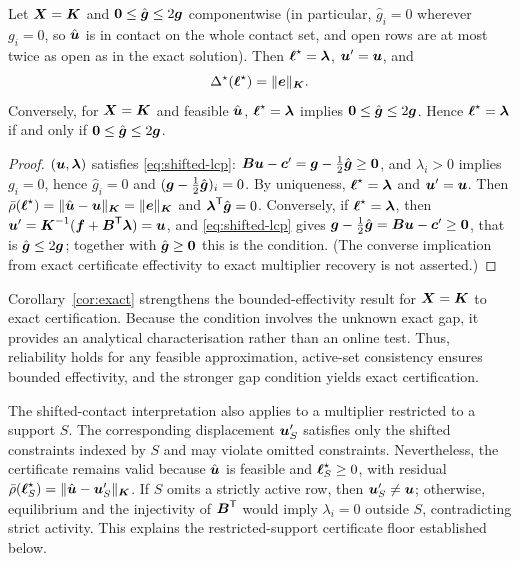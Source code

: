 \begin{corollary}\label{cor:exact}
Let $\boldsymbol{X}=\boldsymbol{K}$ and $\boldsymbol 0\le\hat{\boldsymbol{g}}\le2\boldsymbol{g}$ componentwise (in particular, $\hat g_i=0$ wherever $g_i=0$, so $\hat{\boldsymbol{u}}$ is in contact on the whole
contact set, and open rows are at most twice as open as in the exact solution). Then $\boldsymbol{\ell}^{\star}=\boldsymbol{\lambda}$, $\boldsymbol{u}'=\boldsymbol{u}$, and
\begin{equation}\label{eq:exact}
  \Delta^{\star}(\boldsymbol{\ell}^{\star})=\lVert \boldsymbol{e} \rVert_{\boldsymbol{K}}.
\end{equation}
Conversely, for $\boldsymbol{X}=\boldsymbol{K}$ and feasible $\hat{\boldsymbol{u}}$, $\boldsymbol{\ell}^{\star}=\boldsymbol{\lambda}$ implies $\boldsymbol 0\le\hat{\boldsymbol{g}}\le2\boldsymbol{g}$. Hence $\boldsymbol{\ell}^{\star}=\boldsymbol{\lambda}$ if and only if $\boldsymbol 0\le\hat{\boldsymbol{g}}\le2\boldsymbol{g}$.
\end{corollary}
\begin{proof}
$(\boldsymbol{u},\boldsymbol{\lambda})$ satisfies \eqref{eq:shifted-lcp}: $\boldsymbol{B}\boldsymbol{u}-\boldsymbol{c}'=\boldsymbol{g}-\tfrac12\hat{\boldsymbol{g}}\ge\boldsymbol 0$, and $\lambda_i>0$ implies $g_i=0$, hence $\hat g_i=0$ and
$(\boldsymbol{g}-\frac12\hat{\boldsymbol{g}})_i=0$. By uniqueness, $\boldsymbol{\ell}^{\star}=\boldsymbol{\lambda}$ and $\boldsymbol{u}'=\boldsymbol{u}$. Then $\bar{\rho}(\boldsymbol{\ell}^{\star})=\lVert \hat{\boldsymbol{u}}-\boldsymbol{u} \rVert_{\boldsymbol{K}}=\lVert \boldsymbol{e} \rVert_{\boldsymbol{K}}$ and $\boldsymbol{\lambda}^{\mathsf{T}}\hat{\boldsymbol{g}}=0$.
Conversely, if $\boldsymbol{\ell}^{\star}=\boldsymbol{\lambda}$, then $\boldsymbol{u}'=\boldsymbol{K}^{-1}(\boldsymbol{f}+\boldsymbol{B}^{\mathsf{T}}\boldsymbol{\lambda})=\boldsymbol{u}$, and \eqref{eq:shifted-lcp} gives $\boldsymbol{g}-\frac12\hat{\boldsymbol{g}}=\boldsymbol{B}\boldsymbol{u}-\boldsymbol{c}'\ge\boldsymbol 0$, that is $\hat{\boldsymbol{g}}\le2\boldsymbol{g}$; together with $\hat{\boldsymbol{g}}\ge\boldsymbol 0$ this is the condition.
(The converse implication from exact certificate effectivity to exact multiplier recovery is not asserted.)
\end{proof}

Corollary~\ref{cor:exact} strengthens the bounded-effectivity result for $\boldsymbol{X}=\boldsymbol{K}$ to exact certification. Because the condition involves the
unknown exact gap, it provides an analytical characterisation rather than an online test. Thus, reliability holds for any feasible approximation,
active-set consistency ensures bounded effectivity, and the stronger gap condition yields exact certification.

The shifted-contact interpretation also applies to a multiplier restricted to a support $S$. The corresponding displacement $\boldsymbol{u}'_S$ satisfies only
the shifted constraints indexed by $S$ and may violate omitted constraints. Nevertheless, the certificate remains valid because $\hat{\boldsymbol{u}}$ is feasible
and $\boldsymbol{\ell}^{\star}_S\ge0$, with residual $\bar{\rho}(\boldsymbol{\ell}^{\star}_S)=\lVert \hat{\boldsymbol{u}}-\boldsymbol{u}'_S \rVert_{\boldsymbol{K}}$. If $S$ omits a strictly active row, then $\boldsymbol{u}'_S\ne\boldsymbol{u}$; otherwise,
equilibrium and the injectivity of $\boldsymbol{B}^{\mathsf{T}}$ would imply $\lambda_i=0$ outside $S$, contradicting strict activity. This explains the restricted-support
certificate floor established below.

